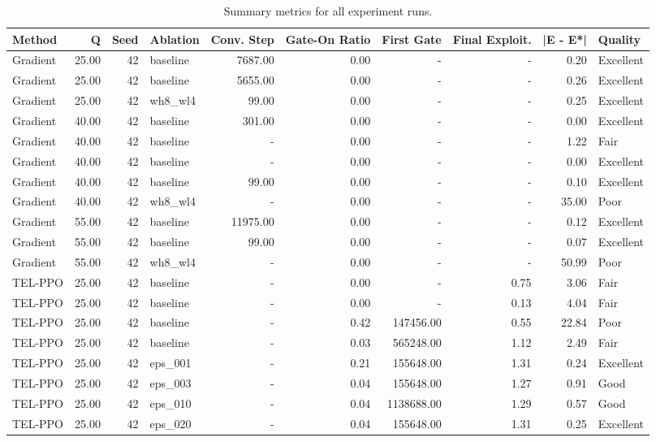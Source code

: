 \begin{table}[htbp]
\centering
\caption{Summary metrics for all experiment runs.}
\label{tab:summary_metrics}
\begin{tabular}{lrrlrrrrrl}
\toprule
Method & Q & Seed & Ablation & Conv. Step & Gate-On Ratio & First Gate & Final Exploit. & |E - E*| & Quality \\
\midrule
Gradient & 25.00 & 42 & baseline & 7687.00 & 0.00 & - & - & 0.20 & Excellent \\
Gradient & 25.00 & 42 & baseline & 5655.00 & 0.00 & - & - & 0.26 & Excellent \\
Gradient & 25.00 & 42 & wh8_wl4 & 99.00 & 0.00 & - & - & 0.25 & Excellent \\
Gradient & 40.00 & 42 & baseline & 301.00 & 0.00 & - & - & 0.00 & Excellent \\
Gradient & 40.00 & 42 & baseline & - & 0.00 & - & - & 1.22 & Fair \\
Gradient & 40.00 & 42 & baseline & - & 0.00 & - & - & 0.00 & Excellent \\
Gradient & 40.00 & 42 & baseline & 99.00 & 0.00 & - & - & 0.10 & Excellent \\
Gradient & 40.00 & 42 & wh8_wl4 & - & 0.00 & - & - & 35.00 & Poor \\
Gradient & 55.00 & 42 & baseline & 11975.00 & 0.00 & - & - & 0.12 & Excellent \\
Gradient & 55.00 & 42 & baseline & 99.00 & 0.00 & - & - & 0.07 & Excellent \\
Gradient & 55.00 & 42 & wh8_wl4 & - & 0.00 & - & - & 50.99 & Poor \\
TEL-PPO & 25.00 & 42 & baseline & - & 0.00 & - & 0.75 & 3.06 & Fair \\
TEL-PPO & 25.00 & 42 & baseline & - & 0.00 & - & 0.13 & 4.04 & Fair \\
TEL-PPO & 25.00 & 42 & baseline & - & 0.42 & 147456.00 & 0.55 & 22.84 & Poor \\
TEL-PPO & 25.00 & 42 & baseline & - & 0.03 & 565248.00 & 1.12 & 2.49 & Fair \\
TEL-PPO & 25.00 & 42 & eps_001 & - & 0.21 & 155648.00 & 1.31 & 0.24 & Excellent \\
TEL-PPO & 25.00 & 42 & eps_003 & - & 0.04 & 155648.00 & 1.27 & 0.91 & Good \\
TEL-PPO & 25.00 & 42 & eps_010 & - & 0.04 & 1138688.00 & 1.29 & 0.57 & Good \\
TEL-PPO & 25.00 & 42 & eps_020 & - & 0.04 & 155648.00 & 1.31 & 0.25 & Excellent \\

\end{tabular}
\end{table}
